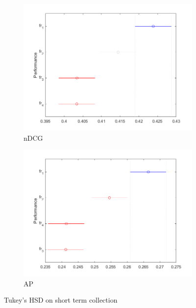 \begin{figure}[tbp]
     \centering
     \begin{subfigure}[b]{0.45\textwidth}
         \centering
         \includegraphics[width=\textwidth]{figure/short-ndcg-hsd.png}
	\caption{\ac{nDCG}}
     \end{subfigure}
     \hfill
     \begin{subfigure}[b]{0.45\textwidth}
         \centering
         \includegraphics[width=\textwidth]{figure/short-map-hsd.png}
	\caption{\ac{AP}}
     \end{subfigure}
        \caption{Tukey's \ac{HSD} on short term collection}
        \label{fig:short-hsd}
\end{figure}